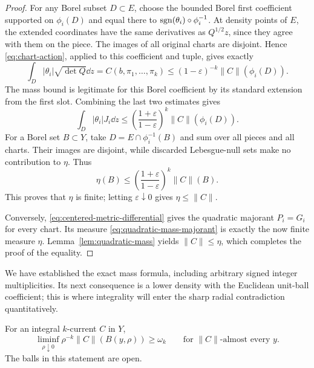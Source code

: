 \begin{proof}
For any Borel subset \(D\subset E\), choose the bounded Borel first
coefficient supported on \(\phi_i(D)\) and equal there to
\(\operatorname{sgn}(\theta_i)\circ\phi_i^{-1}\). At density points of \(E\), the
extended coordinates have the same derivatives as \(Q^{1/2}z\), since
they agree with them on the piece. The images of all original charts
are disjoint. Hence \eqref{eq:chart-action}, applied to this coefficient
and tuple, gives exactly
\[
 \int_D|\theta_i|\sqrt{\det Q}\dd z
 = C(b,\pi_1,\ldots,\pi_k)
 \le(1-\varepsilon)^{-k}\|C\|(\phi_i(D)).
\]
The mass bound is legitimate for this Borel coefficient by its standard
extension from the first slot. Combining the last two estimates gives
\[
 \int_D|\theta_i|J_i\dd z
 \le\left(\frac{1+\varepsilon}{1-\varepsilon}\right)^k
       \|C\|(\phi_i(D)).
\]
For a Borel set \(B\subset Y\), take
\(D=E\cap\phi_i^{-1}(B)\) and sum over all pieces and all charts.
Their images are disjoint, while discarded Lebesgue-null sets make no
contribution to \(\eta\). Thus
\[
 \eta(B)\le
 \left(\frac{1+\varepsilon}{1-\varepsilon}\right)^k\|C\|(B).
\]
This proves that \(\eta\) is finite; letting
\(\varepsilon\downarrow0\) gives \(\eta\le\|C\|\).

Conversely, \eqref{eq:centered-metric-differential} gives the quadratic
majorant \(P_i=G_i\) for every chart. Its measure
\eqref{eq:quadratic-mass-majorant} is exactly the now finite measure
\(\eta\). Lemma~\ref{lem:quadratic-mass} yields \(\|C\|\le\eta\),
which completes the proof of the equality.
\end{proof}

We have established the exact mass formula, including arbitrary signed
integer multiplicities. Its next consequence is a lower density with
the Euclidean unit-ball coefficient; this is where integrality will
enter the sharp radial contradiction quantitatively.

\begin{lemma}
\label{lem:euclidean-density}
For an integral \(k\)-current \(C\) in \(Y\),
\begin{equation}
\label{eq:euclidean-lower-density}
 \liminf_{\rho\downarrow0}
       \rho^{-k}\|C\|(B(y,\rho))\ge\omega_k
 \qquad\text{for }\|C\|\text{-almost every }y.
\end{equation}
The balls in this statement are open.
\end{lemma}

